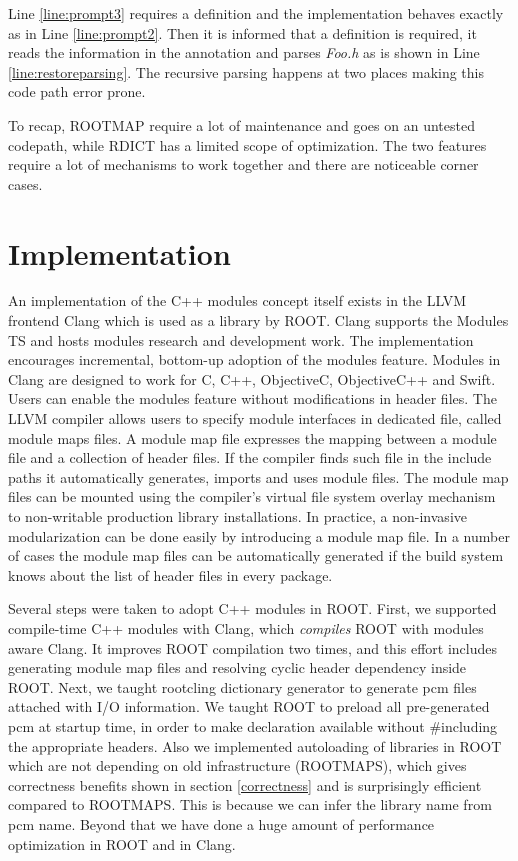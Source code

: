 \documentclass{webofc}
\begin{document}
Line \ref{line:prompt3} requires a definition and the implementation behaves exactly as in Line \ref{line:prompt2}. Then it is informed that a definition is required, it reads the information in the annotation and parses {\it Foo.h} as is shown in Line \ref{line:restoreparsing}. The recursive parsing happens at two places making this code path error prone.

To recap, ROOTMAP require a lot of maintenance and goes on an untested codepath, while RDICT has a limited scope of optimization. The two features require a lot of mechanisms to work together and there are noticeable corner cases.

\section{Implementation}
\label{implementation}

An implementation of the C++ modules concept itself exists in the LLVM frontend Clang which is used as a library by ROOT. Clang supports the Modules TS and hosts modules research and development work. The implementation encourages incremental, bottom-up adoption of the modules feature. Modules in Clang are designed to work for C, C++, ObjectiveC, ObjectiveC++ and Swift. Users can enable the modules feature without modifications in header files. The LLVM compiler allows users to specify module interfaces in dedicated file, called module maps files. A module map file expresses the mapping between a module file and a collection of header files. If the compiler finds such file in the include paths it automatically generates, imports and uses module files. The module map files can be mounted using the compiler’s virtual file system overlay mechanism to non-writable production library installations. In practice, a non-invasive modularization can be done easily by introducing a module map file. In a number of cases the module map files can be automatically generated if the build system knows about the list of header files in every package.

Several steps were taken to adopt C++ modules in ROOT. First, we supported compile-time C++ modules with Clang, which {\it compiles} ROOT with modules aware Clang. It improves ROOT compilation two times, and this effort includes generating module map files and resolving cyclic header dependency inside ROOT. Next, we taught rootcling dictionary generator to generate pcm files attached with I/O information. We taught ROOT to preload all pre-generated pcm at startup time, in order to make declaration available without \#including the appropriate headers. Also we implemented autoloading of libraries in ROOT which are not depending on old infrastructure (ROOTMAPS), which gives correctness benefits shown in section \ref{correctness} and is surprisingly efficient compared to ROOTMAPS. This is because we can infer the library name from pcm name. Beyond that we have done a huge amount of performance optimization in ROOT and in Clang.
\end{document}
